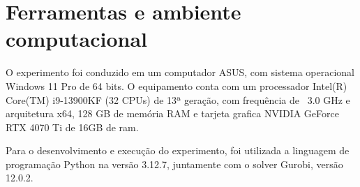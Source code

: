 \section{Ferramentas e ambiente computacional}
O experimento foi conduzido em um computador ASUS, com sistema operacional Windows 11 Pro de 64 bits. O equipamento conta com um processador Intel(R) Core(TM) i9-13900KF (32 CPUs) de 13ª geração, com frequência de ~3.0 GHz e arquitetura x64, 128 GB de memória RAM e tarjeta grafica  NVIDIA GeForce RTX 4070 Ti de 16GB de ram.

Para o desenvolvimento e execução do experimento, foi utilizada a linguagem de programação Python na versão 3.12.7, juntamente com o solver Gurobi, versão 12.0.2.


